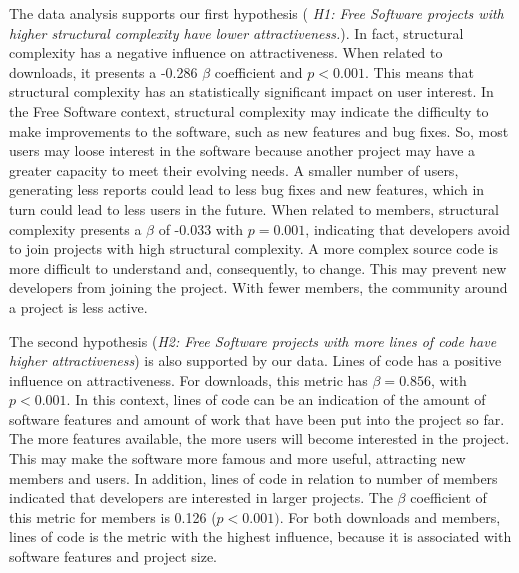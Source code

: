 \documentclass[conference]{IEEEtran}
\newcommand{\TODO}[1]{{\color{red}\textbf{\uwave{#1}}}}
\begin{document}
The data analysis supports our first hypothesis 
(\emph{ H1: Free Software projects with higher structural complexity have lower attractiveness.}).
In fact, structural complexity has a negative influence on attractiveness.
%
When related to downloads, it presents a -0.286 $\beta$ coefficient
and $p < 0.001$.
%
This means that structural complexity has an statistically significant impact on user interest.
In the Free Software context, structural complexity may indicate the
difficulty to make improvements to the software, such as new features and bug
fixes.
%
So, most users may loose interest in the software because another
project may have a greater capacity to meet their evolving needs.
%
A smaller number of users, generating less reports could lead to less bug fixes and
new features, which in turn could lead to less users in the future.
%
When related to members, structural complexity presents a $\beta$ of
-0.033 with $p = 0.001$, indicating that developers avoid to join
projects with high structural complexity. A more complex source code is
more difficult to understand and, consequently, to change. This may prevent
new developers from joining the project. With fewer members, the community around
a project is less active.



The second hypothesis (\emph{H2: Free Software projects with more
lines of code have higher attractiveness}) is also supported by our data.
Lines of code has a positive influence on attractiveness.
%
For downloads, this metric has $\beta = 0.856$, with $p<0.001$.
In this context, lines of code can be an indication of the amount of
software features and amount of work that have been put into the project so far.
The more features available, the more users
will become interested in the project. This may make the software more
famous and more useful, attracting new members and users.
%
In addition, lines of code in relation to number of members indicated that
developers are interested in larger projects. The $\beta$ coefficient of
this metric for members is 0.126 ($p<0.001)$. For both downloads and
members, lines of code is the metric with the highest influence, because
it is associated with software features and project size.
\end{document}
